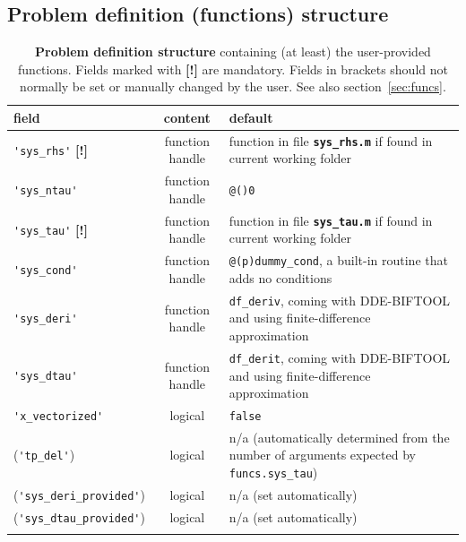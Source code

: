 \documentclass[10pt]{scrartcl}
\newcommand{\DDEBIFCODE}{\textsc{DDE-BIFTOOL}}
\newcommand{\file}[1]{\textbf{\texttt{#1}}}
\newcommand{\blist}[1]{\mbox{\lstinline!#1!}}
\begin{document}
\subsection{Problem definition (functions) structure}
\label{sec:funcs:struct}
\begin{table}[htbp]
  \centering
  \begin{tabular}[t]{l@{\hspace*{1ex}}c@{\hspace*{3ex}}p{}}
      \hline\noalign{\smallskip}
      field     & content &  default   \\\hline\noalign{\smallskip}
      \blist{'sys_rhs'} \textbf{[!]} & function handle &  function in file \file{sys\_rhs.m} if found in 
      current working folder \\[1ex]
      \blist{'sys_ntau'} & function handle &  \blist{@()0} \\[1ex]
      \blist{'sys_tau'}  \textbf{[!]} & function handle &  function in file 
      \file{sys\_tau.m} if found in current working folder\\[1ex]
      \blist{'sys_cond'} & function handle & \blist{@(p)dummy_cond}, a built-in routine that adds no conditions\\[1ex]
      \blist{'sys_deri'} & function handle & \blist{df_deriv}, coming with 
      \DDEBIFCODE{} and using finite-difference approximation\\[1ex]
      \blist{'sys_dtau'} & function handle &  \blist{df_derit}, coming with 
      \DDEBIFCODE{} and using finite-difference approximation\\[1ex]
      \blist{'x_vectorized'} & logical &  \blist{false}\\[1ex]
      (\blist{'tp_del'}) & logical & n/a (automatically
      determined from the number of arguments expected by \blist{funcs.sys_tau})\\[1ex]
      (\blist{'sys_deri_provided'}) & logical & n/a (set automatically)\\[1ex]
      (\blist{'sys_dtau_provided'}) & logical & n/a (set automatically)
      \\\noalign{\smallskip}\hline
  \end{tabular}
  \caption{\textbf{\textsf{Problem definition structure}} containing (at least) 
    the user-provided functions. Fields marked with \textbf{[!]} are mandatory. 
    Fields in brackets should not normally be set or manually changed by the user. See also section~\ref{sec:funcs}.}
  \label{tab:funcs}
\end{table}
\end{document}
